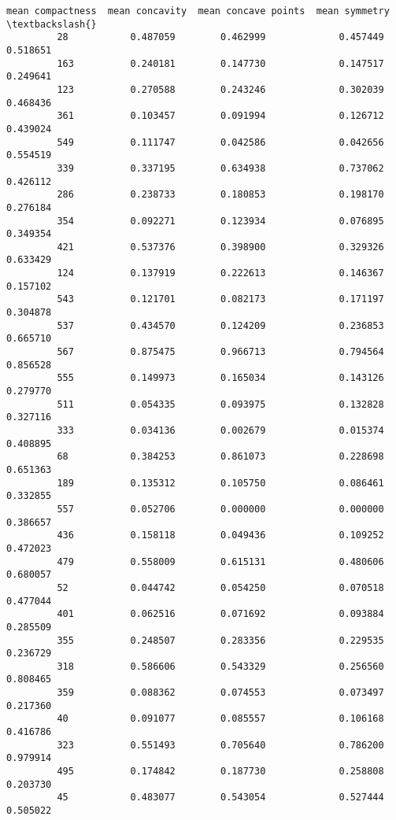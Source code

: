 \documentclass[11pt]{article}
\begin{document}
\begin{Verbatim}[commandchars=\\\{\}]
              mean compactness  mean concavity  mean concave points  mean symmetry  \textbackslash{}
         28           0.487059        0.462999             0.457449       0.518651   
         163          0.240181        0.147730             0.147517       0.249641   
         123          0.270588        0.243246             0.302039       0.468436   
         361          0.103457        0.091994             0.126712       0.439024   
         549          0.111747        0.042586             0.042656       0.554519   
         339          0.337195        0.634938             0.737062       0.426112   
         286          0.238733        0.180853             0.198170       0.276184   
         354          0.092271        0.123934             0.076895       0.349354   
         421          0.537376        0.398900             0.329326       0.633429   
         124          0.137919        0.222613             0.146367       0.157102   
         543          0.121701        0.082173             0.171197       0.304878   
         537          0.434570        0.124209             0.236853       0.665710   
         567          0.875475        0.966713             0.794564       0.856528   
         555          0.149973        0.165034             0.143126       0.279770   
         511          0.054335        0.093975             0.132828       0.327116   
         333          0.034136        0.002679             0.015374       0.408895   
         68           0.384253        0.861073             0.228698       0.651363   
         189          0.135312        0.105750             0.086461       0.332855   
         557          0.052706        0.000000             0.000000       0.386657   
         436          0.158118        0.049436             0.109252       0.472023   
         479          0.558009        0.615131             0.480606       0.680057   
         52           0.044742        0.054250             0.070518       0.477044   
         401          0.062516        0.071692             0.093884       0.285509   
         355          0.248507        0.283356             0.229535       0.236729   
         318          0.586606        0.543329             0.256560       0.808465   
         359          0.088362        0.074553             0.073497       0.217360   
         40           0.091077        0.085557             0.106168       0.416786   
         323          0.551493        0.705640             0.786200       0.979914   
         495          0.174842        0.187730             0.258808       0.203730   
         45           0.483077        0.543054             0.527444       0.505022   

\end{Verbatim}
\end{document}
